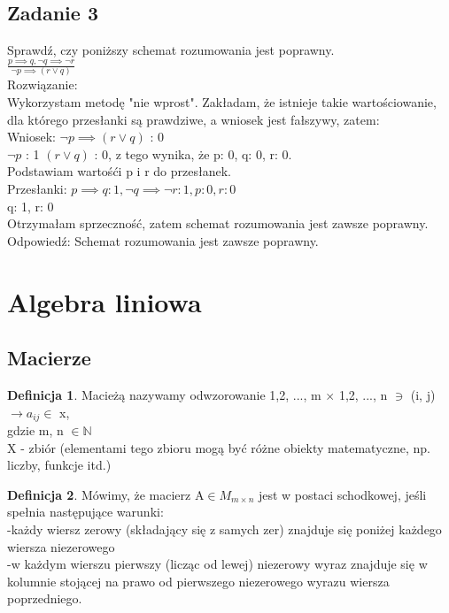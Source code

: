 \documentclass[10pt]{mwart}
\newcommand{\NN}{{\mathbb N}}
\theoremstyle{plain} \newtheorem{tw}{Twierdzenie}[section]
\theoremstyle{plain} \newtheorem{lem}[tw]{Lemat}
\theoremstyle{definition} \newtheorem{df}[tw]{Definicja}
\begin{document}
\subsection{Zadanie 3}
Sprawdź, czy poniższy schemat rozumowania jest poprawny.\\
\(\frac{p \implies q, \neg q \implies \neg r}{\neg p \implies (r \vee q)}\)\\
Rozwiązanie:\\ Wykorzystam metodę "nie wprost". Zakładam, że istnieje takie wartościowanie, dla którego przesłanki są prawdziwe, a wniosek jest fałszywy, zatem:\\Wniosek: \(\neg p \implies (r \vee q)\) : 0\\
\(\neg p\) : 1  \((r \vee q)\) : 0, z tego wynika, że p: 0, q: 0, r: 0.\\ Podstawiam wartośći p i r do przesłanek.\\Przesłanki:
\(p \implies q: 1, \neg q \implies \neg r: 1, p: 0, r: 0\)\\
q: 1, r: 0\\ Otrzymałam sprzeczność, zatem schemat rozumowania jest zawsze poprawny.\\Odpowiedź: Schemat rozumowania jest zawsze poprawny.
\section{Algebra liniowa}
\subsection{Macierze}
\begin{df}
    Macieżą nazywamy odwzorowanie {1,2, ..., m} \(\times\) {1,2, ..., n} \(\ni\) (i, j) \(\to a_{ij}\in\) x,\\gdzie m, n \(\in \NN\)\\ X - zbiór (elementami tego zbioru mogą być różne obiekty matematyczne, np. liczby, funkcje itd.)\cite{odnośnik2}
\end{df}
\begin{df}
    Mówimy, że macierz A\(\in M_{m\times n}\) jest w postaci schodkowej, jeśli spełnia następujące warunki:\\
    -każdy wiersz zerowy (składający się z samych zer) znajduje się poniżej każdego wiersza niezerowego\\
    -w każdym wierszu pierwszy (licząc od lewej) niezerowy wyraz znajduje się w kolumnie stojącej na prawo od pierwszego niezerowego wyrazu wiersza poprzedniego.\cite{odnośnik2}
\end{df}
\end{document}
